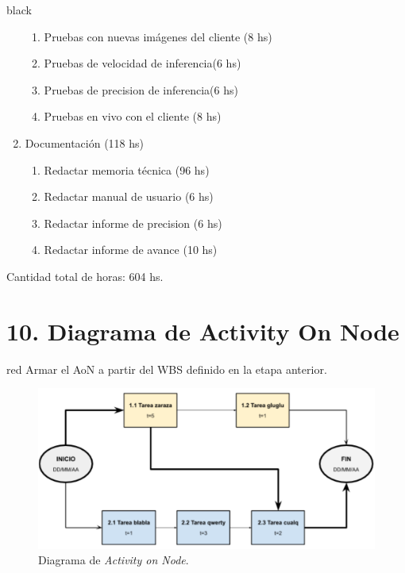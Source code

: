 \documentclass[
11pt, %
]{charter}
\begin{document}
\begin{consigna}{black}
\begin{enumerate}
\begin{enumerate}
	\item Pruebas con nuevas imágenes del cliente (8 hs)
	\item Pruebas de velocidad de inferencia(6 hs)
	\item Pruebas de precision de inferencia(6 hs)
	\item Pruebas en vivo con el cliente (8 hs)
	\end{enumerate}
\item Documentación (118 hs)
	\begin{enumerate}
	\item Redactar memoria técnica (96 hs)
	\item Redactar manual de usuario (6 hs)
	\item Redactar informe de precision (6 hs)
	\item Redactar informe de avance (10 hs)
	\end{enumerate}
\end{enumerate}

Cantidad total de horas: 604 hs.


\end{consigna}

\section{10. Diagrama de Activity On Node}
\label{sec:AoN}

\begin{consigna}{red}
Armar el AoN a partir del WBS definido en la etapa anterior. 



\end{consigna}

\begin{figure}[htpb]
\centering 
\includegraphics[width=.8\textwidth]{./Figuras/AoN.png}
\caption{Diagrama de \textit{Activity on Node}.}
\label{fig:AoN}
\end{figure}
\end{document}
